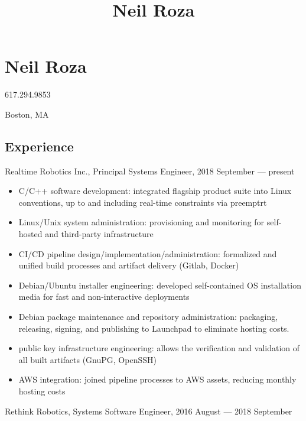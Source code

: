 \documentclass[letterpaper,12pt]{article}
\title{Neil Roza}
\begin{document}
\pagestyle{empty}

\section*{Neil Roza}



617.294.9853

Boston, MA

\subsection*{Experience}

Realtime Robotics Inc., Principal Systems Engineer, 2018 September --- present

\begin{itemize}
\item C/C++ software development: integrated flagship product suite into Linux
  conventions, up to and including real-time constraints via preemptrt
\item Linux/Unix system administration: provisioning and monitoring for
  self-hosted and third-party infrastructure
\item CI/CD pipeline design/implementation/administration: formalized and
  unified build processes and artifact delivery (Gitlab, Docker)
\item Debian/Ubuntu installer engineering: developed self-contained OS
  installation media for fast and non-interactive deployments
\item Debian package maintenance and repository administration: packaging,
  releasing, signing, and publishing to Launchpad to eliminate hosting costs.
\item public key infrastructure engineering: allows the verification and
  validation of all built artifacts (GnuPG, OpenSSH)
\item AWS integration: joined pipeline processes to AWS assets, reducing
  monthly hosting costs
\end{itemize}

Rethink Robotics, Systems Software Engineer, 2016 August --- 2018 September
\end{document}
